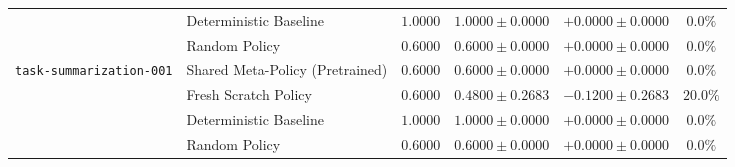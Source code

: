 \begin{table}[!t]
\begin{tabular}{llcccc}
& Deterministic Baseline & $1.0000$ & $1.0000 \pm 0.0000$ & $+0.0000 \pm 0.0000$ & $0.0\%$ \\
& Random Policy & $0.6000$ & $0.6000 \pm 0.0000$ & $+0.0000 \pm 0.0000$ & $0.0\%$ \\
\midrule
\multirow{4}{*}{\texttt{task-summarization-001}} 
& Shared Meta-Policy (Pretrained) & $0.6000$ & $0.6000 \pm 0.0000$ & $+0.0000 \pm 0.0000$ & $0.0\%$ \\
& Fresh Scratch Policy & $0.6000$ & $0.4800 \pm 0.2683$ & $-0.1200 \pm 0.2683$ & $20.0\%$ \\
& Deterministic Baseline & $1.0000$ & $1.0000 \pm 0.0000$ & $+0.0000 \pm 0.0000$ & $0.0\%$ \\
& Random Policy & $0.6000$ & $0.6000 \pm 0.0000$ & $+0.0000 \pm 0.0000$ & $0.0\%$ \\
\bottomrule
\end{tabular}
\end{table}
